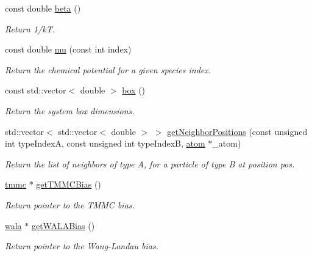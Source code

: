 \begin{DoxyCompactItemize}
const double \hyperlink{classsim_system_a3eeec9678902f8d7fce4dad6064aaf4c}{beta} ()
\begin{DoxyCompactList}\small\item\em Return 1/k\+T. \end{DoxyCompactList}\item 
const double \hyperlink{classsim_system_af1e3f5320aff976a448647244d5950d1}{mu} (const int index)
\begin{DoxyCompactList}\small\item\em Return the chemical potential for a given species\textquotesingle{} index. \end{DoxyCompactList}\item 
const std\+::vector$<$ double $>$ \hyperlink{classsim_system_a8bff9dfb95b1b09a0fab2c1c485ade07}{box} ()
\begin{DoxyCompactList}\small\item\em Return the system box dimensions. \end{DoxyCompactList}\item 
std\+::vector$<$ std\+::vector$<$ double $>$ $>$ \hyperlink{classsim_system_a7ac49b2311cd8230df8d078a9d897b35}{get\+Neighbor\+Positions} (const unsigned int type\+Index\+A, const unsigned int type\+Index\+B, \hyperlink{classatom}{atom} $\ast$\+\_\+atom)
\begin{DoxyCompactList}\small\item\em Return the list of neighbors of type A, for a particle of type B at position pos. \end{DoxyCompactList}\item 
\hyperlink{classtmmc}{tmmc} $\ast$ \hyperlink{classsim_system_aa31d40c91cb50f143a9613d362798887}{get\+T\+M\+M\+C\+Bias} ()
\begin{DoxyCompactList}\small\item\em Return pointer to the T\+M\+M\+C bias. \end{DoxyCompactList}\item 
\hyperlink{classwala}{wala} $\ast$ \hyperlink{classsim_system_a7cb5049de8b0988349e89e30e4000407}{get\+W\+A\+L\+A\+Bias} ()
\begin{DoxyCompactList}\small\item\em Return pointer to the Wang-\/\+Landau bias. \end{DoxyCompactList}\end{DoxyCompactItemize}
